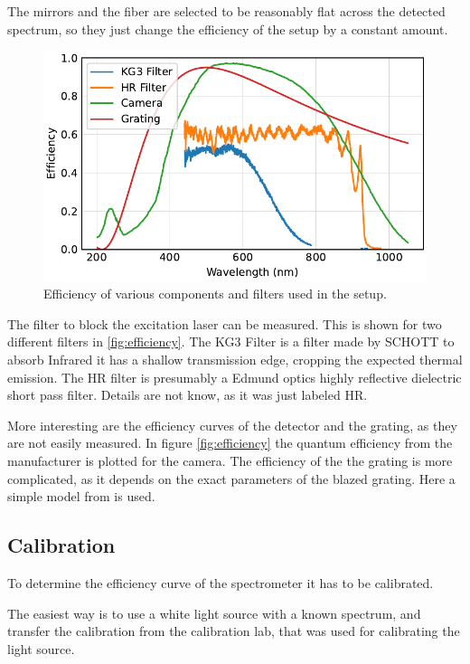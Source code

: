\documentclass[
	parskip=half,
	a4paper,
]{scrarticle}
\begin{document}
The mirrors and the fiber are selected to be reasonably flat across the detected spectrum, so they just change the efficiency of the setup by a constant amount.

\begin{figure}[hb]
    \centering
    \includegraphics{../analysis/figures/filter.pdf}
    \caption{Efficiency of various components and filters used in the setup.}
    \label{fig:efficiency}
\end{figure}
The filter to block the excitation laser can be measured. This is shown for two different filters in \autoref{fig:efficiency}. The KG3 Filter is a filter made by SCHOTT to absorb Infrared it has a shallow transmission edge, cropping the expected thermal emission.
The HR filter is presumably a Edmund optics highly reflective dielectric short pass filter. Details are not know, as it was just labeled HR.

More interesting are the efficiency curves of the detector and the grating, as they are not easily measured. In figure \autoref{fig:efficiency} the quantum efficiency from the manufacturer is plotted for the camera. The efficiency of the the grating is more complicated, as it depends on the exact parameters of the blazed grating. Here a simple model from \cite{barker_ripple_1984} is used.



\subsection{Calibration}
To determine the efficiency curve of the spectrometer it has to be calibrated.

The easiest way is to use a white light source with a known spectrum, and transfer the calibration from the calibration lab, that was used for calibrating the light source.
\end{document}
